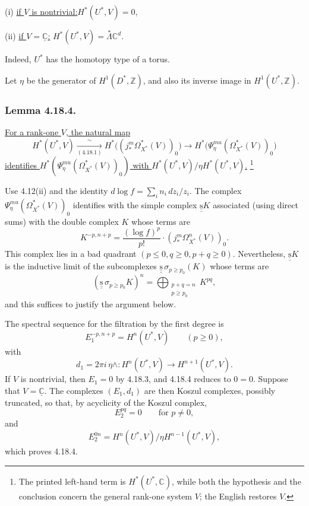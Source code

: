 \noindent\textup{(i)}\qquad
\uline{if $V$ is nontrivial:}\quad $H^*(U^*,V)=0$,

\medskip
\noindent\textup{(ii)}\qquad
\uline{if $V=\underline{\mathbb C}$:}\quad
$H^*(U^*,V)=\overset{*}{\Lambda}\mathbb C^d$.

Indeed, $U^*$ has the homotopy type of a torus.

Let $\eta$ be the generator of $H^1(D^*,\mathbb Z)$, and also its
inverse image in $H^1(U^*,\mathbb Z)$.

\subsubsection*{Lemma 4.18.4.}
\underline{For a rank-one $V$, the natural map}
\[
H^*(U^*,V)
 \xrightarrow[(4.18.1)]{\ \sim\ }
H^*\bigl((j_*^m\Omega_{X^*}^*(V))_0\bigr)
 \longrightarrow
H^*\bigl(\Psi_\eta^{mu}(\Omega_{X^*}^*(V))_0\bigr)
\]
\underline{identifies
$H^*(\Psi_\eta^{mu}(\Omega_{X^*}^*(V))_0)$ with
$H^*(U^*,V)/\eta H^*(U^*,V)$.}
\footnote{The printed left-hand term is $H^*(U^*,\mathbb C)$,
while both the hypothesis and the conclusion concern the general
rank-one system $V$; the English restores $V$.}

Use 4.12(ii) and the identity
$d\log f=\sum_i n_i\,dz_i/z_i$.  The complex
$\Psi_\eta^{mu}(\Omega_{X^*}^*(V))_0$ identifies with the simple
complex $\underline{\underline{\mathrm{s}}}K$ associated (using direct sums) with the double
complex $K$ whose terms are
\[
K^{-p,n+p}=\frac{(\log f)^p}{p!}\cdot
  (j_*^m\Omega_{X^*}^n(V))_0.
\]
This complex lies in a bad quadrant
$(p\leq0,q\geq0,p+q\geq0)$.  Nevertheless, $\underline{\underline{\mathrm{s}}}K$ is the
inductive limit of the subcomplexes
$\underline{\underline{\mathrm{s}}}\,\sigma_{p\geq p_0}(K)$ whose terms are
\[
(\underline{\underline{\mathrm{s}}}\,\sigma_{p\geq p_0}K)^n
=\bigoplus_{\substack{p+q=n\\p\geq p_0}}K^{pq},
\]
and this suffices to justify the argument below.

The spectral sequence for the filtration by the first degree is
\[
E_1^{-p,n+p}=H^n(U^*,V)\qquad(p\geq0),
\]
with
\[
d_1=2\pi i\,\eta\wedge:
H^n(U^*,V)\longrightarrow H^{n+1}(U^*,V).
\]
If $V$ is nontrivial, then $E_1=0$ by 4.18.3, and 4.18.4 reduces
to $0=0$.  Suppose that $V=\underline{\mathbb C}$.  The complexes
$(E_1,d_1)$ are then Koszul complexes, possibly truncated, so that,
by acyclicity of the Koszul complex,
\[
E_2^{pq}=0\qquad\text{for }p\ne0,
\]
and
\[
E_2^{0n}=H^n(U^*,V)/\eta H^{n-1}(U^*,V),
\]
which proves 4.18.4.

